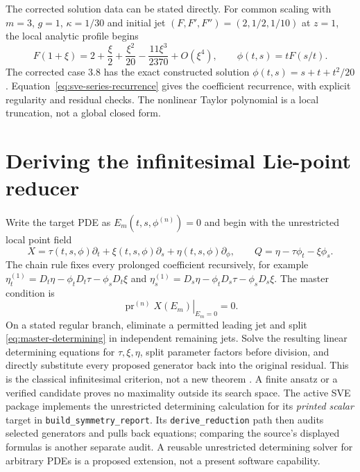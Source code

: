\documentclass[11pt]{article}
\theoremstyle{definition}
\newcommand{\pr}{\operatorname{pr}}
\begin{document}
The corrected solution data can be stated directly. For common scaling with
$m=3$, $g=1$, $\kappa=1/30$ and initial jet $(F,F',F'')=(2,1/2,1/10)$
at $z=1$, the local analytic profile begins
\[
 F(1+\xi)=2+\frac{\xi}{2}+\frac{\xi^2}{20}
                -\frac{11\xi^3}{2370}+O(\xi^4),\qquad
 \phi(t,s)=tF(s/t).
\]
The corrected case 3.8 has the exact constructed solution
$\phi(t,s)=s+t+t^2/20$. Equation~\eqref{eq:sve-series-recurrence} gives the
coefficient recurrence, with explicit regularity and residual checks. The
nonlinear Taylor polynomial is a local truncation, not a global closed form.

\section{Deriving the infinitesimal Lie-point reducer}
\label{sec:infinitesimal-reducer}
Write the target PDE as $E_m(t,s,\phi^{(n)})=0$ and begin with the unrestricted
local point field
\begin{equation}\label{eq:master-generator}
 X=\tau(t,s,\phi)\partial_t+\xi(t,s,\phi)\partial_s
   +\eta(t,s,\phi)\partial_\phi,
 \qquad Q=\eta-\tau\phi_t-\xi\phi_s.
\end{equation}
The chain rule fixes every prolonged coefficient recursively, for example
$\eta_t^{(1)}=D_t\eta-\phi_tD_t\tau-\phi_sD_t\xi$ and
$\eta_s^{(1)}=D_s\eta-\phi_tD_s\tau-\phi_sD_s\xi$.
The master condition is
\begin{equation}\label{eq:master-determining}
 \left.\pr^{(n)}X(E_m)\right|_{E_m=0}=0.
\end{equation}
On a stated regular branch, eliminate a permitted leading jet and split
\eqref{eq:master-determining} in independent remaining jets. Solve the
resulting linear determining equations for $\tau,\xi,\eta$, split parameter
factors before division, and directly substitute every proposed generator
back into the original residual. This is the classical infinitesimal
criterion, not a new theorem \cite{olver,oliveri2026}. A finite ansatz or a
verified candidate proves no maximality outside its search space.
The active SVE package implements the unrestricted determining calculation
for its \emph{printed scalar} target in \texttt{build\_symmetry\_report}.
Its \texttt{derive\_reduction} path then audits selected generators and
pulls back equations; comparing the source's displayed formulas is another
separate audit. A reusable unrestricted determining solver for arbitrary
PDEs is a proposed extension, not a present software capability.
\end{document}

